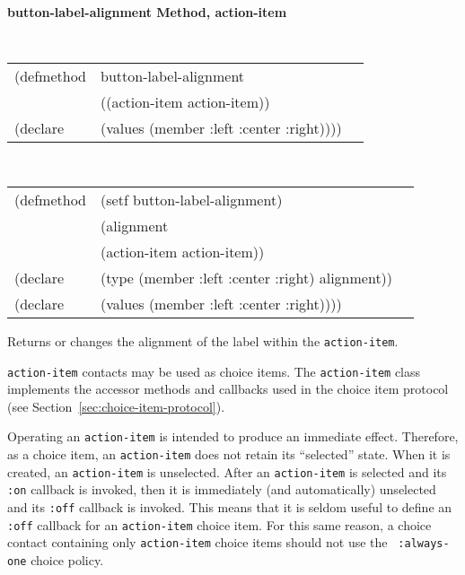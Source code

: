 {\samepage  
{\large {\bf button-label-alignment \hfill Method, action-item}}
\begin{flushright} \parbox[t]{6.125in}{
\tt
\begin{tabular}{lll}
\raggedright
(defmethod & button-label-alignment & \\
& ((action-item  action-item)) \\
(declare & (values (member :left :center :right))))
\end{tabular}
\rm

}\end{flushright}}

\begin{flushright} \parbox[t]{6.125in}{
\tt
\begin{tabular}{lll}
\raggedright
(defmethod & (setf button-label-alignment) & \\
         & (alignment \\
         & (action-item  action-item)) \\
(declare &(type (member :left :center :right)  alignment))\\
(declare & (values (member :left :center :right))))
\end{tabular}
\rm}
\end{flushright}

\begin{flushright} \parbox[t]{6.125in}{
Returns or changes the alignment of the label within the {\tt action-item}.}
\end{flushright}

{\tt action-item} contacts may be used as choice items. The {\tt action-item} class
implements the accessor methods and callbacks used in the choice item protocol (see
Section~\ref{sec:choice-item-protocol}).

Operating an {\tt action-item} is intended to produce an immediate effect.
Therefore, as a choice item, an {\tt action-item} does not retain its
``selected'' state. When it is created, an {\tt action-item} is unselected.
After an {\tt action-item} is selected and its {\tt :on} callback is invoked, then
it is immediately (and  automatically) unselected and its {\tt :off} callback is
invoked. This means that it is seldom useful to define an {\tt :off} callback
for an {\tt action-item} choice item. For this same reason, a choice contact
containing only {\tt action-item} choice items should not use the {\tt
:always-one} choice policy.

